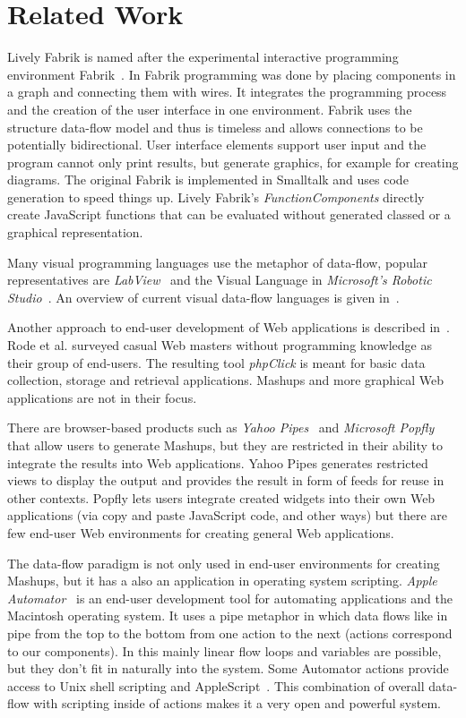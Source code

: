 \documentclass[pdftex, times, 10pt, twocolumn]{article}
\begin{document}
\section{Related Work}
Lively Fabrik is named after the experimental interactive programming environment Fabrik~\cite{Ingalls1988FVP,Ludolph1988FPE}. In Fabrik programming was done by placing components in a graph and connecting them with wires. It integrates the programming process and the creation of the user interface in one environment. Fabrik uses the structure data-flow model and thus is timeless and allows connections to be potentially bidirectional. User interface elements support user input and the program cannot only print results, but generate graphics, for example for creating diagrams. The original Fabrik is implemented in Smalltalk and uses code generation to speed things up. Lively Fabrik's {\em FunctionComponents} directly create JavaScript functions that can be evaluated without generated classed or a graphical representation.  

Many visual programming languages use the metaphor of data-flow, popular representatives are {\em LabView}~\cite{Bitter2006LAP} and the Visual Language in {\em Microsoft's Robotic Studio}~\cite{Morgan2008PMR}. An overview of current visual data-flow languages is given in~\cite{Johnston2004ADP}. 

Another approach to end-user development of Web applications is described in~\cite{Rode2006EUD}. Rode et al. surveyed casual Web masters without programming knowledge as their group of end-users. The resulting tool {\em phpClick} is meant for basic data collection, storage and retrieval applications. Mashups and more graphical Web applications are not in their focus. 

There are browser-based products such as {\em Yahoo Pipes}~\cite{YahooPipes} and {\em Microsoft Popfly}~\cite{MicrosoftPopfly} that allow users to generate Mashups, but they are restricted in their ability to integrate the results into Web applications. Yahoo Pipes generates restricted views to display the output and provides the result in form of feeds for reuse in other contexts. Popfly lets users integrate created widgets into their own Web applications (via copy and paste JavaScript code, and other ways) but there are few end-user Web environments for creating general Web applications. 

The data-flow paradigm is not only used in end-user environments for creating Mashups, but it has a also an application in operating system scripting. {\em Apple Automator}~\cite{AppleAutomator} is an end-user development tool for automating applications and the Macintosh operating system. It uses a pipe metaphor in which data flows like in pipe from the top to the bottom from one action to the next (actions correspond to our components). In this mainly linear flow loops and variables are possible, but they don't fit in naturally into the system. Some Automator actions provide access to Unix shell scripting and AppleScript~\cite{Cook2007AS}. This combination of overall data-flow with scripting inside of actions makes it a very open and powerful system. 
\end{document}
